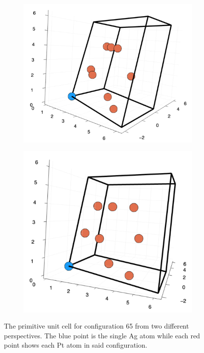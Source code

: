 \begin{figure}
  \centering
  \begin{subfigure}{0.53\textwidth}
    \includegraphics[width=\linewidth]{Figures/primitiveCell1}
    \label{primitiveFirst}
  \end{subfigure}%
  \hspace*{\fill}   %
  \begin{subfigure}{0.49\textwidth}
    \includegraphics[width=\linewidth]{Figures/primitiveCell2}
    \label{primitiveSecond}
  \end{subfigure}%
\caption{The primitive unit cell for configuration 65 from two different perspectives. The blue point is the single Ag atom while each red point shows each Pt atom in said configuration.} \label{primitiveUnitCells}
\end{figure}


